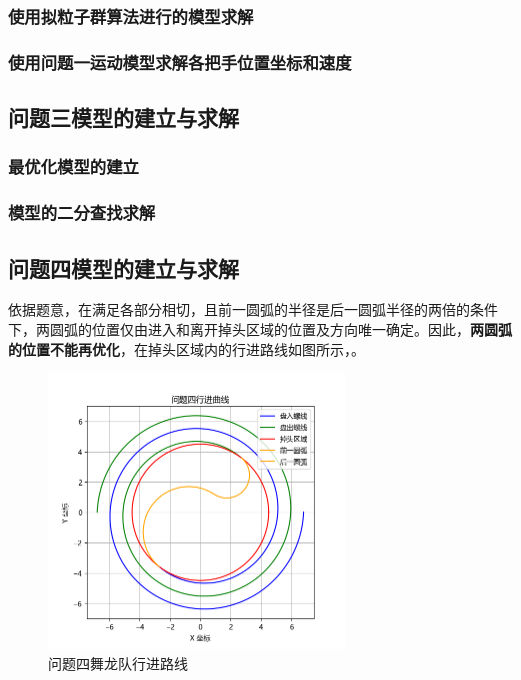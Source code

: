 \documentclass[a4paper]{article}
\begin{document}
	\subsubsection{使用拟粒子群算法进行的模型求解}
        \subsubsection{使用问题一运动模型求解各把手位置坐标和速度}
	\subsection{问题三模型的建立与求解}
	\subsubsection{最优化模型的建立}
        \subsubsection{模型的二分查找求解}
	\subsection{问题四模型的建立与求解}
	
	依据题意，在满足各部分相切，且前一圆弧的半径是后一圆弧半径的两倍的条件下，两圆弧的位置仅由进入和离开掉头区域的位置及方向唯一确定。因此，\textbf{两圆弧的位置不能再优化}，在掉头区域内的行进路线如图所示，。%
	
	\begin{figure}[h]
		\centering
		\includegraphics[width=0.7\textwidth]{image/Figure_5412.png}
		\caption{问题四舞龙队行进路线}
		\label{Figure_5412}
	\end{figure}
	
\end{document}
